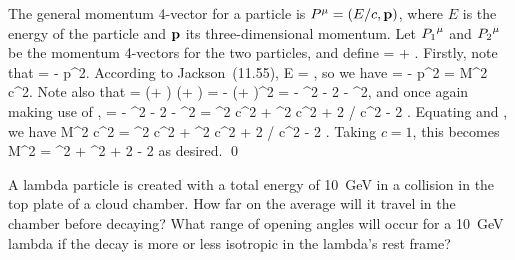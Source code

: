\begin{solution}
	The general momentum 4-vector for a particle is $P^\mu = (E / c, \vb{p})$, where $E$ is the energy of the particle and $\vb{p}$ its three-dimensional momentum.  Let ${P_1}^\mu$ and ${P_2}^\mu$ be the momentum 4-vectors for the two particles, and define
	\beq
		\Pmu = \Pqmu + \Pwmu.
	\eeq
	Firstly, note that
	\beq
		\Pmu \Psmu =  - p^2.
	\eeq
	According to Jackson~(11.55),
	\beqn \label{E}
		E = ,
	\eeqn
	so we have
	\beqn \label{thing4.1}
		\Pmu \Psmu =  - p^2
		= M^2 c^2.
	\eeqn
	Note also that
	\beq
		\Pmu \Psmu = (\Pqmu + \Pwmu) (\Pqsmu + \Pwsmu)
		=  - (\vpq + \vpw)^2
		=  - \pq^2 - 2 \vpq \vdot \vpw - \pw^2,
	\eeq
	and once again making use of ,
	\beqn \label{thing4.2}
		\Pmu \Psmu =  - \pq^2 - 2 \vpq \vdot \vpw - \pw^2
		= \mq^2 c^2 + \mw^2 c^2 + 2 \Eq \Ew / c^2 - 2 \pq \pw \cos\tht.
	\eeqn
	Equating  and , we have
	\beq
		M^2 c^2 = \mq^2 c^2 + \mw^2 c^2 + 2 \Eq \Ew / c^2 - 2 \pq \pw \cos\tht.
	\eeq
	Taking $c = 1$, this becomes
	\beq
		M^2 = \mq^2 + \mw^2 + 2 \Eq \Ew - 2 \pq \pw \cos\tht
	\eeq
	as desired. \qed
\end{solution}



\newcommand{\ELam}{\SI{10}{\GeV}}

\begin{problem}
	A lambda particle is created with a total energy of {\ELam} in a collision in the top plate of a cloud chamber.  How far on the average will it travel in the chamber before decaying?  What range of opening angles will occur for a \SI{10}{\GeV} lambda if the decay is more or less isotropic in the lambda's rest frame?
\end{problem}

\newcommand{\Delt}{\Del t}
\newcommand{\lspeed}{\SI{3.00e8}{\meter\per\second}}

\newcommand{\vvq}{\vv_1}
\newcommand{\vvw}{\vv_2}

\newcommand{\Enucp}{\SI{944}{\MeV}}
\newcommand{\Epip}{\SI{171}{\MeV}}
\newcommand{\Enuc}{\SI{8422}{\MeV}}
\newcommand{\Epi}{\SI{1256}{\MeV}}

\newcommand{\gamnuc}{1.005}
\newcommand{\gampi}{1.221}
\newcommand{\gamLam}{8.969}

\newcommand{\pnucp}{\SI{98}{\MeV}}
\newcommand{\ppip}{\pnucp}
\newcommand{\pnuc}{\SI{8369}{\MeV}}
\newcommand{\ppi}{\SI{1248}{\MeV}}


